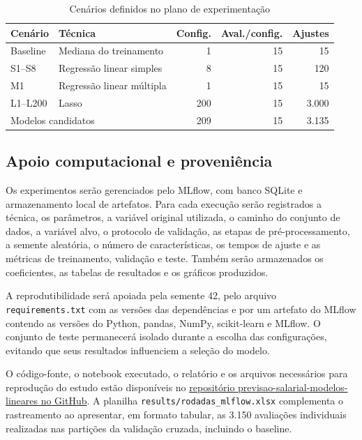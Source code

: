 \begin{table}[H]
    \centering
    \small
    \caption{Cenários definidos no plano de experimentação}
    \label{tab:cenarios}
    \begin{tabular}{llrrr}
        \toprule
        \textbf{Cenário} & \textbf{Técnica} & \textbf{Config.} & \textbf{Aval./config.} & \textbf{Ajustes} \\
        \midrule
        Baseline & Mediana do treinamento & 1 & 15 & 15 \\
        S1--S8 & Regressão linear simples & 8 & 15 & 120 \\
        M1 & Regressão linear múltipla & 1 & 15 & 15 \\
        L1--L200 & Lasso & 200 & 15 & 3.000 \\
        \midrule
        \multicolumn{2}{l}{Modelos candidatos} & 209 & 15 & 3.135 \\
        \bottomrule
    \end{tabular}
\end{table}

\subsection{Apoio computacional e proveniência}

Os experimentos serão gerenciados pelo MLflow, com banco SQLite e armazenamento local de artefatos. Para cada execução serão registrados a técnica, os parâmetros, a variável original utilizada, o caminho do conjunto de dados, a variável alvo, o protocolo de validação, as etapas de pré-processamento, a semente aleatória, o número de características, os tempos de ajuste e as métricas de treinamento, validação e teste. Também serão armazenados os coeficientes, as tabelas de resultados e os gráficos produzidos.

A reprodutibilidade será apoiada pela semente 42, pelo arquivo \texttt{requirements.txt} com as versões das dependências e por um artefato do MLflow contendo as versões do Python, pandas, NumPy, scikit-learn e MLflow. O conjunto de teste permanecerá isolado durante a escolha das configurações, evitando que seus resultados influenciem a seleção do modelo.

O código-fonte, o notebook executado, o relatório e os arquivos necessários para reprodução do estudo estão disponíveis no \href{https://github.com/daniel-cagy/previsao-salarial-modelos-lineares}{repositório previsao-salarial-modelos-lineares no GitHub}. A planilha \texttt{results/rodadas\_mlflow.xlsx} complementa o rastreamento ao apresentar, em formato tabular, as 3.150 avaliações individuais realizadas nas partições da validação cruzada, incluindo o baseline.

\newpage

